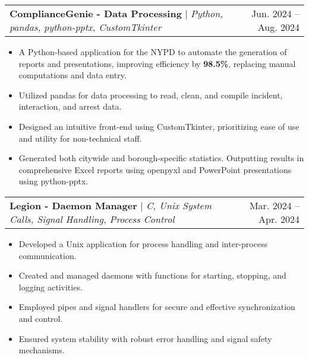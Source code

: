 \documentclass[letterpaper,11pt]{article}
\makeatletter
\newcommand{\resumeItem}[1]{
    \item\small{
      {#1 \vspace{-2pt}}
    }
  }
\newcommand{\resumeProjectHeading}[2]{
      \item
      \begin{tabular*}{0.97\textwidth}{l@{\extracolsep{\fill}}r}
        \small#1 & #2 \\
      \end{tabular*}\vspace{-7pt}
  }
\newcommand{\resumeItemListStart}{\begin{itemize}}
\newcommand{\resumeItemListEnd}{\end{itemize}\vspace{-5pt}}
\makeatother
\begin{document}
\resumeProjectHeading
{\textbf{ComplianceGenie - Data Processing} $|$ \emph{Python, pandas, python-pptx, CustomTkinter}}{Jun. 2024 -- Aug. 2024}
\resumeItemListStart
\resumeItem{A Python-based application for the NYPD to automate the generation of reports and presentations,
  improving efficiency by \textbf{98.5\%}, replacing manual computations and data entry.}
\resumeItem{Utilized pandas for data processing to read, clean, and compile incident, interaction, and arrest data.}
\resumeItem{Designed an intuitive front-end using CustomTkinter, prioritizing ease of use and utility for non-technical staff.}
\resumeItem{Generated both citywide and borough-specific statistics. Outputting results in comprehensive Excel reports using openpyxl and PowerPoint presentations using python-pptx.}

\resumeItemListEnd
\resumeProjectHeading
{\textbf{Legion - Daemon Manager} $|$ \emph{C, Unix System Calls, Signal Handling, Process Control}}{Mar. 2024 -- Apr. 2024}
\resumeItemListStart
\resumeItem{Developed a Unix application for process handling and inter-process communication. }
\resumeItem{Created and managed daemons with functions for starting, stopping, and logging activities.}
\resumeItem{Employed pipes and signal handlers for secure and effective synchronization and control.}
\resumeItem{Ensured system stability with robust error handling and signal safety mechanisms.}
\resumeItemListEnd
\end{document}
